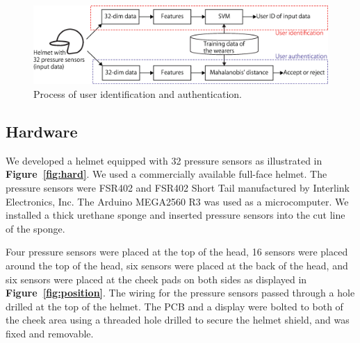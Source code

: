 \documentclass[sigconf,authordraft]{acmart}
\newcommand\figref[1]{\textbf{Figure~\ref{fig:#1}}}
\begin{document}
\begin{figure}[!t]
  \centering
    \includegraphics[width=1\linewidth]{figure/system.eps}
  \caption{Process of user identification and authentication.}
  \label{fig:system}
\end{figure}


\subsection{Hardware}
\label{sec:hardware}
We developed a helmet equipped with 32 pressure sensors as illustrated in \figref{hard}.
We used a commercially available full-face helmet. The pressure sensors were FSR402 and FSR402 Short Tail manufactured by Interlink Electronics, Inc. The Arduino MEGA2560 R3 was used as a microcomputer. We installed a thick urethane sponge and inserted pressure sensors into the cut line of the sponge.\par

Four pressure sensors were placed at the top of the head, 16 sensors were placed around the top of the head, six sensors were placed at the back of the head, and six sensors were placed at the cheek pads on both sides as displayed in \figref{position}.
The wiring for the pressure sensors passed through a hole drilled at the top of the helmet. The PCB and a display were bolted to both of the cheek area using a threaded hole drilled to secure the helmet shield, and was fixed and removable.
\end{document}
